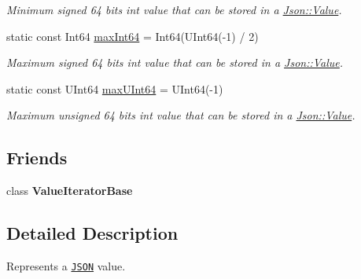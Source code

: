 \begin{DoxyCompactItemize}
\begin{DoxyCompactList}\small\item\em Minimum signed 64 bits int value that can be stored in a \hyperlink{classJson_1_1Value}{Json\+::\+Value}. \end{DoxyCompactList}\item 
static const Int64 \hyperlink{classJson_1_1Value_a4492634870b8c5709ce967b384ac6006}{max\+Int64} = Int64(U\+Int64(-\/1) / 2)\hypertarget{classJson_1_1Value_a4492634870b8c5709ce967b384ac6006}{}\label{classJson_1_1Value_a4492634870b8c5709ce967b384ac6006}

\begin{DoxyCompactList}\small\item\em Maximum signed 64 bits int value that can be stored in a \hyperlink{classJson_1_1Value}{Json\+::\+Value}. \end{DoxyCompactList}\item 
static const U\+Int64 \hyperlink{classJson_1_1Value_ae1eb89c305c39516696ff305cffa01da}{max\+U\+Int64} = U\+Int64(-\/1)\hypertarget{classJson_1_1Value_ae1eb89c305c39516696ff305cffa01da}{}\label{classJson_1_1Value_ae1eb89c305c39516696ff305cffa01da}

\begin{DoxyCompactList}\small\item\em Maximum unsigned 64 bits int value that can be stored in a \hyperlink{classJson_1_1Value}{Json\+::\+Value}. \end{DoxyCompactList}\end{DoxyCompactItemize}
\subsection*{Friends}
\begin{DoxyCompactItemize}
\item 
class {\bfseries Value\+Iterator\+Base}\hypertarget{classJson_1_1Value_ad016df56489e5d360735457afba2f649}{}\label{classJson_1_1Value_ad016df56489e5d360735457afba2f649}

\end{DoxyCompactItemize}


\subsection{Detailed Description}
Represents a \href{http://www.json.org}{\tt J\+S\+ON} value. 


